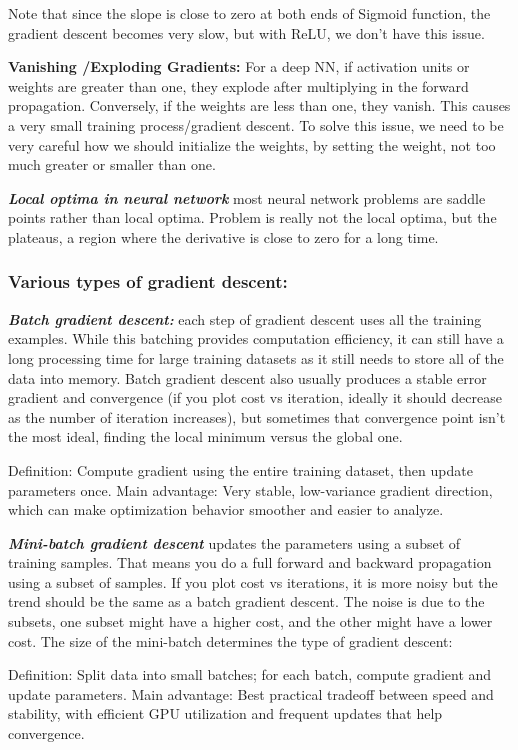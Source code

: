 \documentclass[12pt]{report}
\begin{document}
Note that since the slope is close to zero at both ends of Sigmoid function, the gradient descent becomes very slow, but with ReLU, we don't have this issue.


\textbf{Vanishing /Exploding Gradients:}
For a deep NN, if activation units or weights are greater than one, they explode after multiplying in the forward propagation. Conversely, if the weights are less than one, they vanish. This causes a very small training process/gradient descent. To solve this issue, we need to be very careful how we should initialize the weights, by setting the weight, not too much greater or smaller than one.

\textbf{\textit{Local optima in neural network}} most neural network problems are saddle points rather than local optima. Problem is really not the local optima, but the plateaus, a region where the derivative is close to zero for a long time.


\subsubsection{Various types of gradient descent:}
\textbf{\textit{Batch gradient descent:}} each step of gradient descent uses all the training examples. While this batching provides computation efficiency, it can still have a long processing time for large training datasets as it still needs to store all of the data into memory. Batch gradient descent also usually produces a stable error gradient and convergence (if you plot cost vs iteration, ideally it should decrease as the number of iteration increases), but sometimes that convergence point isn't the most ideal, finding the local minimum versus the global one.


Definition: Compute gradient using the entire training dataset, then update parameters once.
Main advantage: Very stable, low-variance gradient direction, which can make optimization behavior smoother and easier to analyze.

\textbf{\textit{Mini-batch gradient descent}} updates the parameters using a subset of training samples. That means you do a full forward and backward propagation using a subset of samples. If you plot cost vs iterations, it is more noisy but the trend should be the same as a batch gradient descent. The noise is due to the subsets, one subset might have a higher cost, and the other might have a lower cost. The size of the mini-batch determines the type of gradient descent:

Definition: Split data into small batches; for each batch, compute gradient and update parameters.
Main advantage: Best practical tradeoff between speed and stability, with efficient GPU utilization and frequent updates that help convergence.
\end{document}
